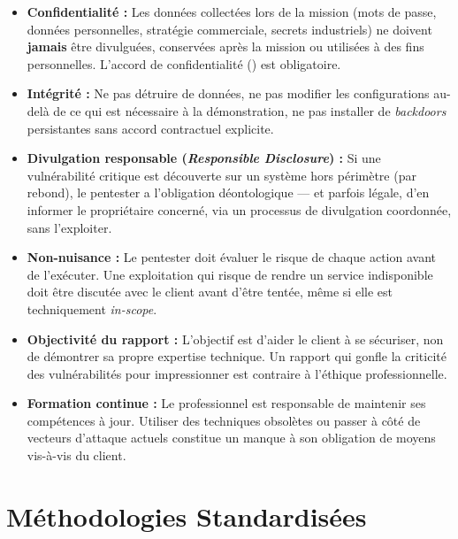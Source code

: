 \begin{itemize}
    \item \textbf{Confidentialité :} Les données collectées lors de la mission
          (mots de passe, données personnelles, stratégie commerciale, secrets
          industriels) ne doivent \textbf{jamais} être divulguées, conservées
          après la mission ou utilisées à des fins personnelles. L'accord de
          confidentialité () est obligatoire.

    \item \textbf{Intégrité :} Ne pas détruire de données, ne pas modifier les
          configurations au-delà de ce qui est nécessaire à la démonstration,
          ne pas installer de \textit{backdoors} persistantes sans accord
          contractuel explicite.

    \item \textbf{Divulgation responsable (\textit{Responsible Disclosure}) :}
          Si une vulnérabilité critique est découverte sur un système hors
          périmètre (par rebond), le pentester a l'obligation déontologique —
          et parfois légale, d'en informer le propriétaire concerné, via
          un processus de divulgation coordonnée, sans l'exploiter.

    \item \textbf{Non-nuisance :} Le pentester doit évaluer le risque de chaque
          action avant de l'exécuter. Une exploitation qui risque de rendre
          un service indisponible doit être discutée avec le client avant
          d'être tentée, même si elle est techniquement \textit{in-scope}.

    \item \textbf{Objectivité du rapport :} L'objectif est d'aider le client
          à se sécuriser, non de démontrer sa propre expertise technique. Un
          rapport qui gonfle la criticité des vulnérabilités pour impressionner
          est contraire à l'éthique professionnelle.

    \item \textbf{Formation continue :} Le professionnel est responsable de
          maintenir ses compétences à jour. Utiliser des techniques obsolètes
          ou passer à côté de vecteurs d'attaque actuels constitue un manque
          à son obligation de moyens vis-à-vis du client.
\end{itemize}

\section{Méthodologies Standardisées}
\label{sec:methodologies}


